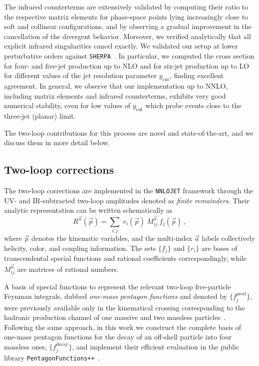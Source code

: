 \documentclass[10pt,aps,prl,superscriptaddress,twocolumn,preprintnumbers,nofootinbib]{revtex4-2}
\newcommand{\ycut}{y_{\mathrm{cut}}}
\begin{document}
The infrared counterterms are extensively validated by computing their ratio to the respective matrix elements for phase-space points lying increasingly close to soft and collinear configurations, and by observing a gradual improvement in the cancellation of the divergent behavior. Moreover, we verified analytically that all explicit infrared singularities cancel exactly. We validated our setup at lower perturbative orders against \texttt{SHERPA}~\cite{Sherpa:2019gpd,Sherpa:2024mfk}. In particular, we computed the cross section for four- and five-jet production up to NLO and for six-jet production up to LO for different values of the jet resolution parameter $\ycut$, finding excellent agreement. In general, we observe that our implementation up to NNLO, including matrix elements and infrared counterterms, exhibits very good numerical stability, even for low values of $\ycut$ which probe events close to the three-jet (planar) limit.

The two-loop contributions for this process are novel and state-of-the-art, and we discuss them in more detail below.


\subsection{Two-loop corrections}

The two-loop corrections are implemented in the \texttt{NNLOJET} framework through the UV- and IR-subtracted two-loop amplitudes denoted as \emph{finite remainders}.
Their analytic representation can be written schematically as
\begin{equation} \label{eq:finite-remainder}
  R^{\vec{a}}(\vec{p}) = \sum_{i,j} \; r_{i}(\vec{p}) ~ M^{\vec{a}}_{i j} ~ f_j(\vec{p}) \,,
\end{equation}
where $\vec{p}$ denotes the kinematic variables, and the multi-index $\vec{a}$ labels collectively helicity, color, and coupling information.
The sets $\{ f_j \}$ and $\{r_i\}$ are bases of transcendental special functions and rational coefficients correspondingly,
while $M^{\vec{a}}_{i j}$ are matrices of rational numbers.

A basis of special functions to represent the relevant two-loop five-particle Feynman integrals, dubbed \textit{one-mass pentagon functions} and denoted by $\{f_j^{\text{prod}}\}$, were previously available only in the kinematical crossing corresponding to the hadronic production channel of one massive and two massless particles~\cite{Chicherin:2021dyp,Abreu:2023rco}.
Following the same approach, in this work we construct the complete basis of one-mass pentagon functions for the decay of an off-shell particle into four massless ones, $\{f_j^{\text{decay}}\}$, and implement their efficient evaluation in the public library \texttt{PentagonFunctions++}~\cite{PentagonFunctions}.
\end{document}
